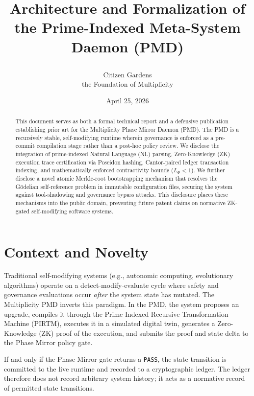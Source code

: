 \documentclass[11pt]{article}
\title{
    \textbf{Architecture and Formalization of the Prime-Indexed Meta-System Daemon (PMD)}\\
    \vspace{0.5cm}
    
}
\author{Citizen Gardens \\ the Foundation of Multiplicity}
\date{April 25, 2026}
\begin{document}
\maketitle

\begin{abstract}
This document serves as both a formal technical report and a defensive publication establishing prior art for the Multiplicity Phase Mirror Daemon (PMD). The PMD is a recursively stable, self-modifying runtime wherein governance is enforced as a pre-commit compilation stage rather than a post-hoc policy review. We disclose the integration of prime-indexed Natural Language (NL) parsing, Zero-Knowledge (ZK) execution trace certification via Poseidon hashing, Cantor-paired ledger transaction indexing, and mathematically enforced contractivity bounds (\(L_\Phi < 1\)). We further disclose a novel atomic Merkle-root bootstrapping mechanism that resolves the Gödelian self-reference problem in immutable configuration files, securing the system against tool-shadowing and governance bypass attacks. This disclosure places these mechanisms into the public domain, preventing future patent claims on normative ZK-gated self-modifying software systems.
\end{abstract}
\newpage
\tableofcontents

\section{Context and Novelty}
Traditional self-modifying systems (e.g., autonomic computing, evolutionary algorithms) operate on a detect-modify-evaluate cycle where safety and governance evaluations occur \textit{after} the system state has mutated. The Multiplicity PMD inverts this paradigm. In the PMD, the system proposes an upgrade, compiles it through the Prime-Indexed Recursive Transformation Machine (PIRTM), executes it in a simulated digital twin, generates a Zero-Knowledge (ZK) proof of the execution, and submits the proof and state delta to the Phase Mirror policy gate. 

If and only if the Phase Mirror gate returns a \texttt{PASS}, the state transition is committed to the live runtime and recorded to a cryptographic ledger. The ledger therefore does not record arbitrary system history; it acts as a normative record of permitted state transitions.
\end{document}
